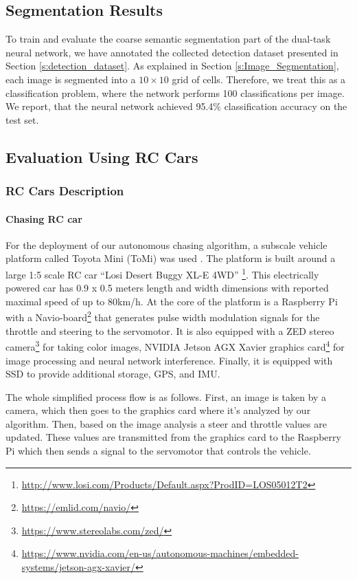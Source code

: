 \documentclass{ctuthesis/ctuthesis}
\begin{document}
\subsection{Segmentation Results}
To train and evaluate the coarse semantic segmentation part of the dual-task neural network, we have annotated the collected detection dataset presented in Section \ref{s:detection_dataset}. As explained in Section \ref{s:Image_Segmentation}, each image is segmented into a $10\times 10$ grid of cells. Therefore, we treat this as a classification problem, where the network performs 100 classifications per image. We report, that the neural network achieved 95.4\% classification accuracy on the test set.





\subsection{Evaluation Using RC Cars}
\subsubsection{RC Cars Description}
\paragraph{Chasing RC car}
For the deployment of our autonomous chasing algorithm, a subscale vehicle platform called Toyota Mini (ToMi) was used \cite{tomi_Cech2020}. The platform is built around a large 1:5 scale RC car ``Losi Desert Buggy XL-E 4WD'' \footnote{\href{http://www.losi.com/Products/Default.aspx?ProdID=LOS05012T2}{http://www.losi.com/Products/Default.aspx?ProdID=LOS05012T2}}. This electrically powered car has 0.9 x 0.5 meters length and width dimensions with reported maximal speed of up to 80km/h. At the core of the platform is a Raspberry Pi with a Navio-board\footnote{\href{https://emlid.com/navio/}{https://emlid.com/navio/}} that generates pulse width modulation signals for the throttle and steering to the servomotor. It is also equipped with a ZED stereo camera\footnote{\href{https://www.stereolabs.com/zed/}{https://www.stereolabs.com/zed/}} for taking color images, NVIDIA Jetson AGX Xavier graphics card\footnote{\href{https://www.nvidia.com/en-us/autonomous-machines/embedded-systems/jetson-agx-xavier/}{https://www.nvidia.com/en-us/autonomous-machines/embedded-systems/jetson-agx-xavier/}} for image processing and neural network interference. Finally, it is equipped with SSD to provide additional storage, GPS, and IMU. \par
The whole simplified process flow is as follows. First, an image is taken by a camera, which then goes to the graphics card where it's analyzed by our algorithm. Then, based on the image analysis a steer and throttle values are updated. These values are transmitted from the graphics card to the Raspberry Pi which then sends a signal to the servomotor that controls the vehicle.
\end{document}
